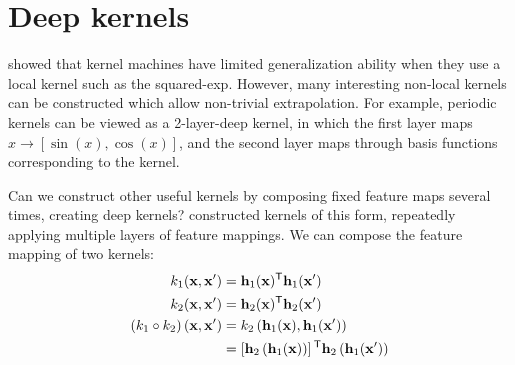 





\section{Deep kernels}
\label{sec:deep_kernels}


\cite{NIPS2005_424} showed that kernel machines have limited generalization ability when they use a local kernel such as the squared-exp.
However, many interesting non-local kernels can be constructed which allow non-trivial extrapolation.
For example, periodic kernels can be viewed as a 2-layer-deep kernel, in which the first layer maps $x \rightarrow [\sin(x), \cos(x)]$, and the second layer maps through basis functions corresponding to the  kernel.

 
Can we construct other useful kernels by composing fixed feature maps several times, creating deep kernels?  \citet{cho2012kernel} constructed kernels of this form, repeatedly applying multiple layers of feature mappings.
We can compose the feature mapping of two kernels:
\begin{align}
k_{1}({\bf{x}}, {\bf{x}}') & = {\bf{h}}_1({\bf{x}}) {^\mathsf{T}} {\bf{h}}_1({\bf{x}}') \\
k_{2}({\bf{x}}, {\bf{x}}') & = {\bf{h}}_2({\bf{x}}) {^\mathsf{T}} {\bf{h}}_2({\bf{x}}') \\
\left( k_1 \circ k_2 \right)({\bf{x}}, {\bf{x}}') & = k_2 \left({\bf{h}}_1({\bf{x}}), {\bf{h}}_1({\bf{x}}') \right) \\
& = \left[ {\bf{h}}_2 \left( {\bf{h}}_1({\bf{x}}) \right)\right] {^\ensuremath{\mathsf{T}}} {\bf{h}}_2 \left({\bf{h}}_1({\bf{x}}') \right) 
\end{align}

